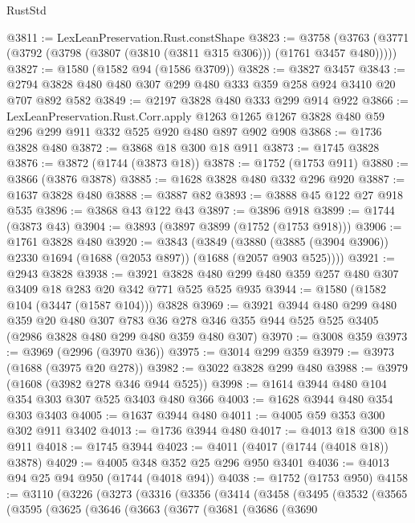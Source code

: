 \begin{lexlean}{RustStd}
\begin{coremodule}
@3811 := LexLeanPreservation.Rust.constShape
@3823 := @3758 (@3763 (@3771 (@3792 (@3798 (@3807 (@3810 (@3811 @315 @306))) (@1761 @3457 @480)))))
@3827 := @1580 (@1582 @94 (@1586 @3709))
@3828 := @3827 @3457
@3843 := @2794 @3828 @480 @480 @307 @299 @480 @333 @359 @258 @924 @3410 @20 @707 @892 @582
@3849 := @2197 @3828 @480 @333 @299 @914 @922
@3866 := LexLeanPreservation.Rust.Corr.apply
    @1263
    @1265
    @1267
    @3828
    @480
    @59
    @296
    @299
    @911
    @332
    @525
    @920
    @480
    @897
    @902
    @908
@3868 := @1736 @3828 @480
@3872 := @3868 @18 @300 @18 @911
@3873 := @1745 @3828
@3876 := @3872 (@1744 (@3873 @18))
@3878 := @1752 (@1753 @911)
@3880 := @3866 (@3876 @3878)
@3885 := @1628 @3828 @480 @332 @296 @920
@3887 := @1637 @3828 @480
@3888 := @3887 @82
@3893 := @3888 @45 @122 @27 @918 @535
@3896 := @3868 @43 @122 @43
@3897 := @3896 @918
@3899 := @1744 (@3873 @43)
@3904 := @3893 (@3897 @3899 (@1752 (@1753 @918)))
@3906 := @1761 @3828 @480
@3920 := @3843
    (@3849 (@3880 (@3885 (@3904 @3906)) @2330 @1694 (@1688 (@2053 @897)) (@1688 (@2057 @903 @525))))
@3921 := @2943 @3828
@3938 := @3921 @3828 @480 @299 @480 @359 @257 @480 @307 @3409 @18 @283 @20 @342 @771 @525 @525 @935
@3944 := @1580 (@1582 @104 (@3447 (@1587 @104))) @3828
@3969 := @3921
    @3944
    @480
    @299
    @480
    @359
    @20
    @480
    @307
    @783
    @36
    @278
    @346
    @355
    @944
    @525
    @525
    @3405
    (@2986 @3828 @480 @299 @480 @359 @480 @307)
@3970 := @3008 @359
@3973 := @3969 (@2996 (@3970 @36))
@3975 := @3014 @299 @359
@3979 := @3973 (@1688 (@3975 @20 @278))
@3982 := @3022 @3828 @299 @480
@3988 := @3979 (@1608 (@3982 @278 @346 @944 @525))
@3998 := @1614 @3944 @480 @104 @354 @303 @307 @525 @3403 @480 @366
@4003 := @1628 @3944 @480 @354 @303 @3403
@4005 := @1637 @3944 @480
@4011 := @4005 @59 @353 @300 @302 @911 @3402
@4013 := @1736 @3944 @480
@4017 := @4013 @18 @300 @18 @911
@4018 := @1745 @3944
@4023 := @4011 (@4017 (@1744 (@4018 @18)) @3878)
@4029 := @4005 @348 @352 @25 @296 @950 @3401
@4036 := @4013 @94 @25 @94 @950 (@1744 (@4018 @94))
@4038 := @1752 (@1753 @950)
@4158 := @3110
    (@3226
      (@3273
        (@3316
          (@3356
            (@3414
              (@3458
                (@3495
                  (@3532
                    (@3565
                      (@3595
                        (@3625
                          (@3646
                            (@3663
                              (@3677
                                (@3681
                                  (@3686
                                    (@3690

\end{coremodule}
\end{lexlean}
